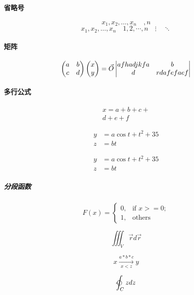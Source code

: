 \documentclass[UTF8]{ctexart}
\begin{document}
\paragraph{省略号}
\[x_1,x_2,\dots,x_n \quad ,n\]
\[ x_1,x_2,\dots ,x_n\quad 1,2,\cdots ,n\quad
\vdots\quad \ddots \]

\paragraph{矩阵}
\[
	\begin{pmatrix}
		a&b\\c&d
	\end{pmatrix}
	\begin{pmatrix}
		x\\y
	\end{pmatrix}
	=\vec{O}{}\\
	\begin{vmatrix}
		afhadjkfa&b\\d&rdafefaef
	\end{vmatrix}
\]
\paragraph{多行公式}
\begin{multline}
	x=a+b+c+{}\\d+e+f
\end{multline}

\begin{align}
	y&=a\cos{t}+t^2+35\\
	z&=bt
\end{align}

\begin{equation}
	\begin{split}
		y&=a\cos{t}+t^2+35\\
		z&=bt
	\end{split}
\end{equation}

\subparagraph{分段函数}
\begin{equation}
	F(x)=
	\begin{cases}
		0,&\text{if } x>=0;\\
		1,&\text{others}
	\end{cases}
\end{equation}

\[\iiint_V \vec{r} d\vec{r}\]

\[x \xrightarrow[x<z]{a*b*c}y\]

\[\ointclockwise_C z dz\]
\end{document}
